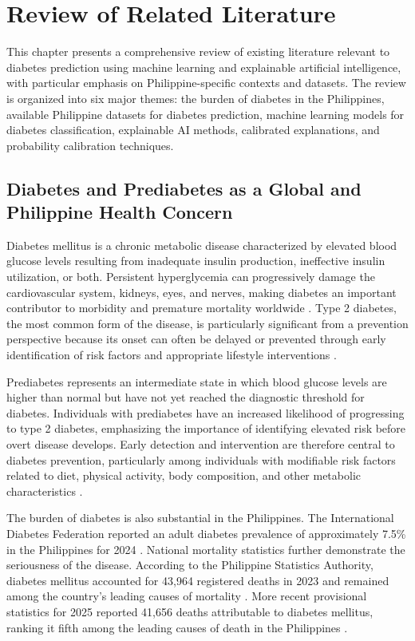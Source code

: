 \section{Review of Related Literature}

This chapter presents a comprehensive review of existing literature relevant to diabetes prediction using machine learning and explainable artificial intelligence, with particular emphasis on Philippine-specific contexts and datasets. The review is organized into six major themes: the burden of diabetes in the Philippines, available Philippine datasets for diabetes prediction, machine learning models for diabetes classification, explainable AI methods, calibrated explanations, and probability calibration techniques.

\subsection{Diabetes and Prediabetes as a Global and Philippine Health Concern}

Diabetes mellitus is a chronic metabolic disease characterized by elevated blood glucose levels resulting from inadequate insulin production, ineffective insulin utilization, or both. Persistent hyperglycemia can progressively damage the cardiovascular system, kidneys, eyes, and nerves, making diabetes an important contributor to morbidity and premature mortality worldwide \cite{who_diabetes_2026}. Type 2 diabetes, the most common form of the disease, is particularly significant from a prevention perspective because its onset can often be delayed or prevented through early identification of risk factors and appropriate lifestyle interventions \cite{who_diabetes_2026}.

Prediabetes represents an intermediate state in which blood glucose levels are higher than normal but have not yet reached the diagnostic threshold for diabetes. Individuals with prediabetes have an increased likelihood of progressing to type 2 diabetes, emphasizing the importance of identifying elevated risk before overt disease develops. Early detection and intervention are therefore central to diabetes prevention, particularly among individuals with modifiable risk factors related to diet, physical activity, body composition, and other metabolic characteristics \cite{who_diabetes_qa_2026}.

The burden of diabetes is also substantial in the Philippines. The International Diabetes Federation reported an adult diabetes prevalence of approximately 7.5\% in the Philippines for 2024 \cite{idf_philippines_2024}. National mortality statistics further demonstrate the seriousness of the disease. According to the Philippine Statistics Authority, diabetes mellitus accounted for 43,964 registered deaths in 2023 and remained among the country's leading causes of mortality \cite{psa_deaths_2023}. More recent provisional statistics for 2025 reported 41,656 deaths attributable to diabetes mellitus, ranking it fifth among the leading causes of death in the Philippines \cite{psa_deaths_2025}.

